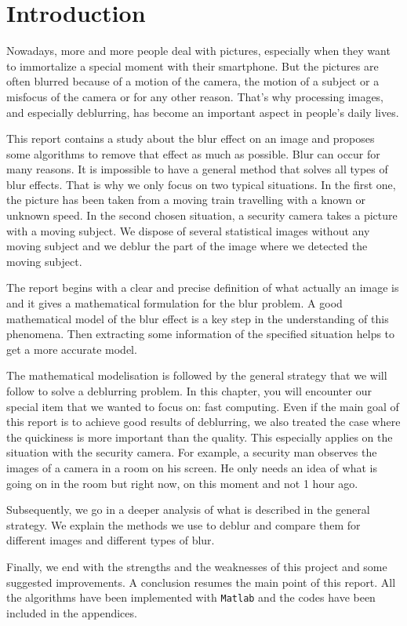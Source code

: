 \chapter{Introduction}

Nowadays, more and more people deal with pictures, especially when they want to immortalize a special moment with their smartphone. But the pictures are often blurred because of a motion of the camera, the motion of a subject or a misfocus of the camera or for any other reason. That's why processing images, and especially deblurring, has become an important aspect in people's daily lives.

This report contains a study about the blur effect on an image and proposes some algorithms to remove that effect as much as possible. Blur can occur for many reasons. It is impossible to have a general method that solves all types of blur effects. That is why we only focus on two typical situations. In the first one, the picture has been taken from a moving train travelling with a known or unknown speed. In the second chosen situation, a security camera takes a picture with a moving subject. We dispose of several statistical images without any moving subject and we deblur the part of the image where we detected the moving subject.

The report begins with a clear and precise definition of what actually an image is and it gives a mathematical formulation for the blur problem. A good mathematical model of the blur effect is a key step in the understanding of this phenomena. Then extracting some information of the specified situation helps to get a more accurate model.

The mathematical modelisation is followed by the general strategy that we will follow to solve a deblurring problem. In this chapter, you will encounter our special item that we wanted to focus on: fast computing. Even if the main goal of this report is to achieve good results of deblurring, we also treated the case where the quickiness is more important than the quality. This especially applies on the situation with the security camera. For example, a security man observes the images of a camera in a room on his screen. He only needs an idea of what is going on in the room but right now, on this moment and not 1 hour ago.

Subsequently, we go in a deeper analysis of what is described in the general strategy. We explain the methods we use to deblur and compare them for different images and different types of blur.

Finally, we end with the strengths and the weaknesses of this project and some suggested improvements. A conclusion resumes the main point of this report. All the algorithms have been implemented with \texttt{Matlab} and the codes have been included in the appendices.
